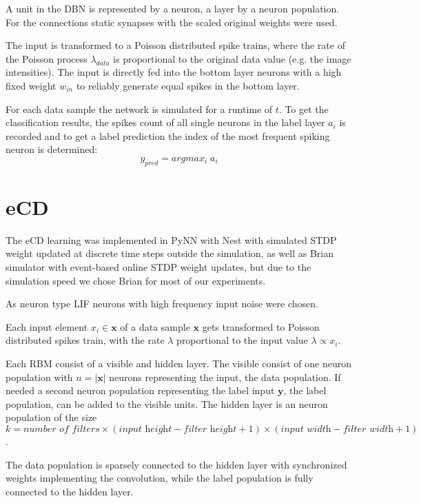 A unit in the DBN is represented by a neuron, a layer by a neuron population.
For the connections static synapses with the scaled original weights were used. 

The input is transformed to a Poisson distributed spike trains, where the rate of the Poisson process $\lambda_{data}$ is proportional to the original data value (e.g. the image intensities). 
The input is directly fed into the bottom layer neurons with a high fixed weight $w_{in}$ to reliably generate equal spikes in the bottom layer.    

For each data sample the network is simulated for a runtime of $t$. 
To get the classification results, the spikes count of all single neurons in the label layer $a_i$ is recorded and to get a label prediction the index of the most frequent spiking neuron is determined:
\[
y_{pred} = argmax_i \; a_i
\]


\section{eCD}

The eCD learning was implemented in PyNN with Nest with simulated STDP weight updated at discrete time steps outside the simulation, as well as Brian simulator with event-based online STDP weight updates, but due to the simulation speed we chose Brian for most of our experiments.

As neuron type LIF neurons with high frequency input noise were chosen.

Each input element $x_i \in \textbf{x}$ of a data sample $\textbf{x}$ gets transformed to Poisson distributed spikes train, with the rate $\lambda$ proportional to the input value $\lambda \propto x_i$. 

Each RBM consist of a visible and hidden layer. 
The visible consist of one neuron population with $n = |\textbf{x}|$ neurons representing the input, the data population. 
If needed a second neuron population representing the label input $\textbf{y}$, the label population, can be added to the visible units.
The hidden layer is an neuron population of the size  $ k = \textit{number of filters} \times (\textit{input height} - \textit{filter height} + 1) \times (\textit{input width} - \textit{filter width} + 1)$.

The data population is sparsely connected to the hidden layer with synchronized weights implementing the convolution, while the label population is fully connected to the hidden layer.

